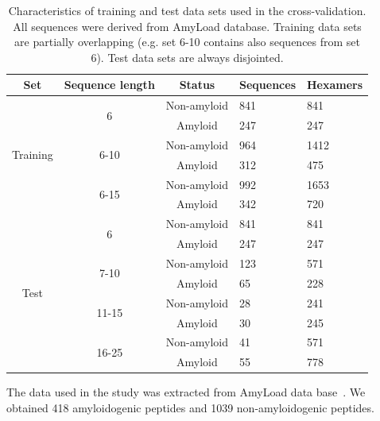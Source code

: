 \documentclass[fleqn,10pt,twoside]{gcb15submission}
\begin{document}
\begin{table}[h]
\centering
\small
\caption{Characteristics of training and test data sets used in the 
cross-validation. All sequences were derived from AmyLoad database. Training 
data sets are partially overlapping (e.g. set 6-10 contains also sequences 
from set 6). Test data sets are always disjointed.}
\label{tab:data_sets}
\begin{tabular}{cccll}
\toprule
Set & Sequence length & Status & Sequences & Hexamers \\ 
\midrule
\multirow{6}{*}{Training} & \multirow{2}{*}{6} & Non-amyloid & 841 & 841 
\\
 &  & \cellcolor[gray]{0.85}Amyloid & \cellcolor[gray]{0.85}247 & 
\cellcolor[gray]{0.85}247 \\
 \cline{2-5}
 & \multirow{2}{*}{6-10} & Non-amyloid & 964 & 1412 \\
 &  & \cellcolor[gray]{0.85}Amyloid & \cellcolor[gray]{0.85}312 & 
\cellcolor[gray]{0.85}475 \\
 \cline{2-5}
 & \multirow{2}{*}{6-15} & Non-amyloid & 992 & 1653 \\
 &  & \cellcolor[gray]{0.85}Amyloid & \cellcolor[gray]{0.85}342 & 
\cellcolor[gray]{0.85}720 \\
 \hline
 \hline
\multirow{8}{*}{Test} & \multirow{2}{*}{6} & Non-amyloid & 841 & 841 \\
 &  & \cellcolor[gray]{0.85}Amyloid & \cellcolor[gray]{0.85}247 & 
\cellcolor[gray]{0.85}247 \\
 \cline{2-5}
 & \multirow{2}{*}{7-10} & Non-amyloid & 123 & 571 \\
 &  & \cellcolor[gray]{0.85}Amyloid & \cellcolor[gray]{0.85}65 & 
\cellcolor[gray]{0.85}228 \\
 \cline{2-5}
 & \multirow{2}{*}{11-15} & Non-amyloid & 28 & 241 \\
 &  & \cellcolor[gray]{0.85}Amyloid & \cellcolor[gray]{0.85}30 & 
\cellcolor[gray]{0.85}245 \\
 \cline{2-5}
 & \multirow{2}{*}{16-25} & Non-amyloid & 41 & 571 \\
 &  & \cellcolor[gray]{0.85}Amyloid & \cellcolor[gray]{0.85}55 & 
\cellcolor[gray]{0.85}778 \\
 \bottomrule
\end{tabular}
\end{table}

The data used in the study was extracted from AmyLoad data 
base~\citep{wozniak_amyload:_2015}. We obtained 418 amyloidogenic peptides and 
1039 non-amyloidogenic peptides.
\end{document}
